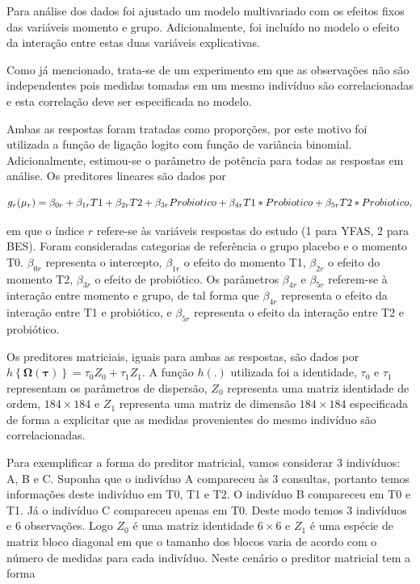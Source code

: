 \documentclass[AMA,STIX1COL]{WileyNJD-v2}
\begin{document}
Para análise dos dados foi ajustado um modelo multivariado com os efeitos fixos das variáveis momento e grupo. Adicionalmente, foi incluído no modelo o efeito da interação entre estas duas variáveis explicativas.

Como já mencionado, trata-se de um experimento em que as observações não são independentes pois medidas tomadas em um mesmo indivíduo são correlacionadas e esta correlação deve ser especificada no modelo. 

Ambas as respostas foram tratadas como proporções, por este motivo foi utilizada a função de ligação logito com função de variância binomial. Adicionalmente, estimou-se o parâmetro de potência para todas as respostas em análise. Os preditores lineares são dados por

$$
g_{r}(\mu_{r}) = \beta_{0r} + \beta_{1r} T1 + \beta_{2r} T2 + \beta_{3r} Probiotico + \\ \beta_{4r} T1*Probiotico + \beta_{5r} T2*Probiotico,
$$

\noindent em que o índice $r$ refere-se às variáveis respostas do estudo (1 para YFAS, 2 para BES). Foram consideradas categorias de referência o grupo placebo e o momento T0. $\beta_{0r}$ representa o intercepto, $\beta_{1r}$ o efeito do momento T1, $\beta_{2r}$ o efeito do momento T2, $\beta_{3r}$ o efeito de probiótico. Os parâmetros $\beta_{4r}$ e $\beta_{5r}$ referem-se à interação entre momento e grupo, de tal forma que $\beta_{4r}$ representa o efeito da interação entre T1 e probiótico, e $\beta_{5r}$ representa o efeito da interação entre T2 e probiótico.

Os preditores matriciais, iguais para ambas as respostas, são dados por $h\left \{ \boldsymbol{\Omega}(\boldsymbol{\tau}) \right \} = \tau_0Z_0 + \tau_1Z_1$. A função $h(.)$ utilizada foi a identidade, $\tau_0$ e $\tau_1$ representam os parâmetros de dispersão, $Z_0$ representa uma matriz identidade de ordem, $184 \times 184$ e $Z_1$ representa uma matriz de dimensão $184 \times 184$ especificada de forma a explicitar que as medidas provenientes do mesmo indivíduo são correlacionadas. 

Para exemplificar a forma do preditor matricial, vamos considerar 3 indivíduos: A, B e C. Suponha que o indivíduo A compareceu às 3 consultas, portanto temos informações deste indivíduo em T0, T1 e T2. O indivíduo B compareceu em T0 e T1. Já o indivíduo C compareceu apenas em T0. Deste modo temos 3 indivíduos e 6 observações. Logo $Z_0$ é uma matriz identidade $6 \times 6$ e $Z_1$ é uma espécie de matriz bloco diagonal em que o tamanho dos blocos varia de acordo com o número de medidas para cada indivíduo. Neste cenário o preditor matricial tem a forma
\end{document}
